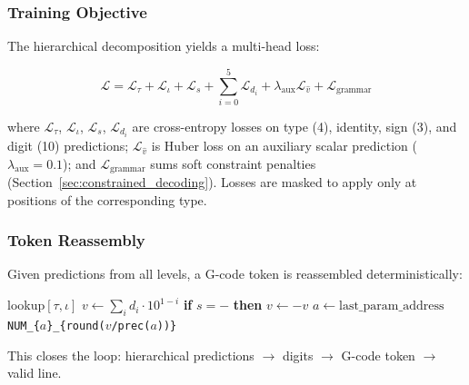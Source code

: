 \documentclass[11pt]{article}
\begin{document}
\subsubsection{Training Objective}

The hierarchical decomposition yields a multi-head loss:

\begin{equation}
\mathcal{L} = \mathcal{L}_\tau + \mathcal{L}_\iota + \mathcal{L}_s + \sum_{i=0}^{5} \mathcal{L}_{d_i} + \lambda_{\text{aux}} \mathcal{L}_{\hat{v}} + \mathcal{L}_{\text{grammar}}
\label{eq:loss}
\end{equation}

where $\mathcal{L}_\tau$, $\mathcal{L}_\iota$, $\mathcal{L}_s$, $\mathcal{L}_{d_i}$ are cross-entropy losses on type (4), identity, sign (3), and digit (10) predictions; $\mathcal{L}_{\hat{v}}$ is Huber loss on an auxiliary scalar prediction ($\lambda_{\text{aux}} = 0.1$); and $\mathcal{L}_{\text{grammar}}$ sums soft constraint penalties (Section~\ref{sec:constrained_decoding}). Losses are masked to apply only at positions of the corresponding type.

\subsubsection{Token Reassembly}

Given predictions from all levels, a G-code token is reassembled deterministically:

\begin{algorithmic}[1]
\small
{}
        \State \Return lookup$[\tau, \iota]$  
        \State $v \gets \sum_i d_i \cdot 10^{1-i}$  
        \State \textbf{if} $s = -$ \textbf{then} $v \gets -v$
        \State $a \gets \text{last\_param\_address}$
        \State \Return \texttt{NUM\_\{$a$\}\_\{round($v$/prec($a$))\}}
    \EndIf
\EndFunction
\end{algorithmic}

\smallskip\noindent This closes the loop: hierarchical predictions $\to$ digits $\to$ G-code token $\to$ valid line.
\end{document}
